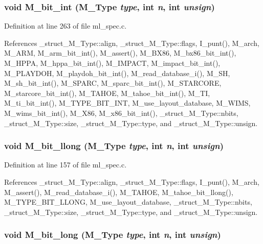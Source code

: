 \subsubsection{\setlength{\rightskip}{0pt plus 5cm}void M\_\-bit\_\-int (\bf{M\_\-Type} {\em type}, int {\em n}, int {\em unsign})}\label{ml__spec_8c_b8fa5fce803586c5b36fa8d2a0830037}




Definition at line 263 of file ml\_\-spec.c.

References \_\-struct\_\-M\_\-Type::align, \_\-struct\_\-M\_\-Type::flags, I\_\-punt(), M\_\-arch, M\_\-ARM, M\_\-arm\_\-bit\_\-int(), M\_\-assert(), M\_\-BX86, M\_\-bx86\_\-bit\_\-int(), M\_\-HPPA, M\_\-hppa\_\-bit\_\-int(), M\_\-IMPACT, M\_\-impact\_\-bit\_\-int(), M\_\-PLAYDOH, M\_\-playdoh\_\-bit\_\-int(), M\_\-read\_\-database\_\-i(), M\_\-SH, M\_\-sh\_\-bit\_\-int(), M\_\-SPARC, M\_\-sparc\_\-bit\_\-int(), M\_\-STARCORE, M\_\-starcore\_\-bit\_\-int(), M\_\-TAHOE, M\_\-tahoe\_\-bit\_\-int(), M\_\-TI, M\_\-ti\_\-bit\_\-int(), M\_\-TYPE\_\-BIT\_\-INT, M\_\-use\_\-layout\_\-database, M\_\-WIMS, M\_\-wims\_\-bit\_\-int(), M\_\-X86, M\_\-x86\_\-bit\_\-int(), \_\-struct\_\-M\_\-Type::nbits, \_\-struct\_\-M\_\-Type::size, \_\-struct\_\-M\_\-Type::type, and \_\-struct\_\-M\_\-Type::unsign.
\subsubsection{\setlength{\rightskip}{0pt plus 5cm}void M\_\-bit\_\-llong (\bf{M\_\-Type} {\em type}, int {\em n}, int {\em unsign})}\label{ml__spec_8c_5a393ce907a4599ac6b997fb79ad38bf}




Definition at line 157 of file ml\_\-spec.c.

References \_\-struct\_\-M\_\-Type::align, \_\-struct\_\-M\_\-Type::flags, I\_\-punt(), M\_\-arch, M\_\-assert(), M\_\-read\_\-database\_\-i(), M\_\-TAHOE, M\_\-tahoe\_\-bit\_\-llong(), M\_\-TYPE\_\-BIT\_\-LLONG, M\_\-use\_\-layout\_\-database, \_\-struct\_\-M\_\-Type::nbits, \_\-struct\_\-M\_\-Type::size, \_\-struct\_\-M\_\-Type::type, and \_\-struct\_\-M\_\-Type::unsign.
\subsubsection{\setlength{\rightskip}{0pt plus 5cm}void M\_\-bit\_\-long (\bf{M\_\-Type} {\em type}, int {\em n}, int {\em unsign})}\label{ml__spec_8c_9106c50101b71a03b2fbb31b7ac8e3b9}





